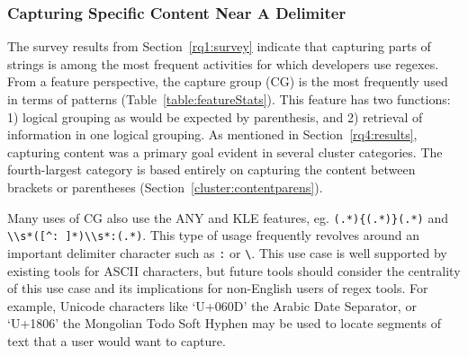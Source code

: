 \subsubsection{Capturing Specific Content Near A Delimiter}
The survey results from Section~\ref{rq1:survey} indicate that capturing parts of strings is among the most frequent activities for which developers use regexes.
From a feature perspective, the capture group (CG) is the most frequently used in terms of patterns (Table~\ref{table:featureStats}).  This feature has two functions: 1) logical grouping as would be expected by parenthesis, and 2) retrieval of information in one logical grouping.  As mentioned in Section~\ref{rq4:results}, capturing content was a primary goal evident in several cluster categories.  The fourth-largest category is based entirely on capturing the content between brackets or parentheses (Section~\ref{cluster:contentparens}).



Many uses of CG also use the ANY and KLE features, eg. \verb!(.*){(.*)}(.*)! and \verb!\\s*([^: ]*)\\s*:(.*)!.  This type of usage frequently revolves around an important delimiter character such as \verb!:! or \verb!\!.  This use case is well supported by existing tools for ASCII characters, but future tools should consider the centrality of this use case and its implications for non-English users of regex tools.  For example, Unicode characters like `U+060D' the Arabic Date Separator, or `U+1806' the Mongolian Todo Soft Hyphen may be used to locate segments of text that a user would want to capture.


